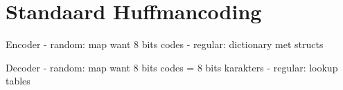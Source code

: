 \section{Standaard Huffmancoding}

Encoder
	- random: map want 8 bits codes
	- regular: dictionary met structs
	
Decoder
	- random: map want 8 bits codes = 8 bits karakters
	- regular: lookup tables